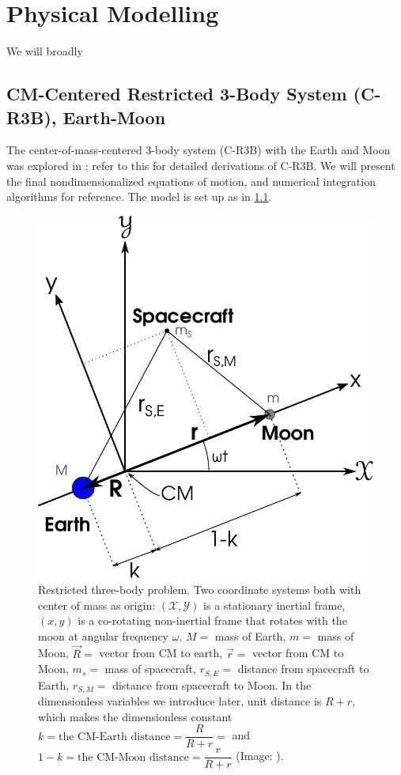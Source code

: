 
\chapter{Physical Modelling}
We will broadly 

\section{CM-Centered Restricted 3-Body System (C-R3B), Earth-Moon}
The center-of-mass-centered 3-body system (C-R3B) with the Earth and Moon was explored in \cite{Saxe2015}; refer to this for detailed derivations of C-R3B. We will present the final nondimensionalized equations of motion, and numerical integration algorithms for reference. The model is set up as in \cref{fig:r3b}.

\begin{figure}[ht!]
    \centering
    \includegraphics[scale=0.75]{fig/r3b.pdf}
    \caption{Restricted three-body problem. Two coordinate systems both with center of mass as origin: $(\mathscr{X},\mathscr{Y})$ is a stationary inertial frame, $(x,y)$ is a co-rotating non-inertial frame that rotates with the moon at angular frequency $\omega$. $M =$ mass of Earth, $m =$ mass of Moon, $\vec{R} =$ vector from CM to earth, $\vec{r} =$ vector from CM to Moon, $m_s =$ mass of spacecraft, $r_{S,E} =$ distance from spacecraft to Earth, $r_{S,M} =$ distance from spacecraft to Moon. In the dimensionless variables we introduce later, unit distance is $R+r$, which makes the dimensionless constant $k = \text{the CM-Earth distance} = \dfrac{R}{R+r} = $ and $1-k = \text{the CM-Moon distance} = \dfrac{r}{R+r}$ (Image: \cite{Saxe2015}).}
    \label{fig:r3b}
\end{figure}


